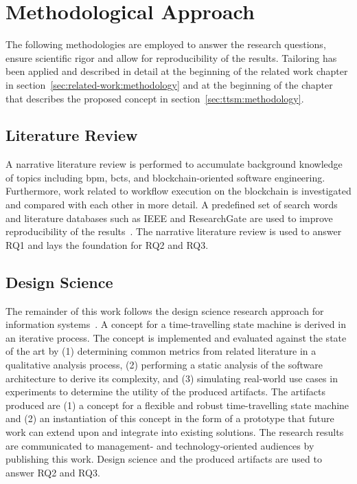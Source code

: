 \section{Methodological Approach}
\label{sec:introduction:methodology}
The following methodologies are employed to answer the research questions, ensure scientific rigor and allow for reproducibility of the results. Tailoring has been applied and described in detail at the beginning of the related work chapter in section~\ref{sec:related-work:methodology} and at the beginning of the chapter that describes the proposed concept in section~\ref{sec:ttsm:methodology}.


\subsection{Literature Review}
\label{sec:introduction:literature_review}
A narrative literature review is performed to accumulate background knowledge of topics including \gls{bpm}, \glspl{bct}, and blockchain-oriented software engineering. Furthermore, work related to workflow execution on the blockchain is investigated and compared with each other in more detail. A predefined set of search words and literature databases such as IEEE and ResearchGate are used to improve reproducibility of the results~\cite{literature_review_rhoades,literature_review_stratton}. The narrative literature review is used to answer RQ1 and lays the foundation for RQ2 and RQ3.


\subsection{Design Science}
\label{sec:introduction:design_science}
The remainder of this work follows the design science research approach for information systems~\cite{hevner2004_design_science}. A concept for a time-travelling state machine is derived in an iterative process. The concept is implemented and evaluated against the state of the art by (1) determining common metrics from related literature in a qualitative analysis process, (2) performing a static analysis of the software architecture to derive its complexity, and (3) simulating real-world use cases in experiments to determine the utility of the produced artifacts. The artifacts produced are (1) a concept for a flexible and robust time-travelling state machine and (2) an instantiation of this concept in the form of a prototype that future work can extend upon and integrate into existing solutions. The research results are communicated to management- and technology-oriented audiences by publishing this work. Design science and the produced artifacts are used to answer RQ2 and RQ3.


